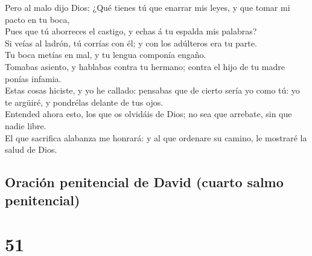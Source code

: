  Pero al malo dijo Dios: ¿Qué tienes tú que enarrar mis
leyes, y que tomar mi pacto en tu boca,\\
 Pues que tú aborreces el castigo, y echas á tu espalda
mis palabras?\\
 Si veías al ladrón, tú corrías con él; y con los
adúlteros era tu parte.\\
 Tu boca metías en mal, y tu lengua componía engaño.\\
 Tomabas asiento, y hablabas contra tu hermano; contra el
hijo de tu madre ponías infamia.\\
 Estas cosas hiciste, y yo he callado: pensabas que de
cierto sería yo como tú: yo te argüiré, y pondrélas delante de tus
ojos.\\
 Entended ahora esto, los que os olvidáis de Dios; no sea
que arrebate, sin que nadie libre.\\
 El que sacrifica alabanza me honrará: y al que ordenare
su camino, le mostraré la salud de Dios.

\hypertarget{oraciuxf3n-penitencial-de-david-cuarto-salmo-penitencial}{%
\subsection{Oración penitencial de David (cuarto salmo
penitencial)}\label{oraciuxf3n-penitencial-de-david-cuarto-salmo-penitencial}}

\hypertarget{section-50}{%
\section{51}\label{section-50}}

